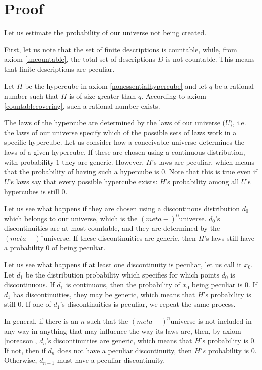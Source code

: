 \documentclass[a4paper
,draft
]{article}
\begin{document}
\section{Proof}

Let us estimate the probability of our universe not being created.

First, let us note that the set of finite descriptions is countable, while, from axiom \ref{uncountable}, the total set of descriptions $D$ is not countable. This means that finite descriptions are peculiar.

Let $H$ be the hypercube in axiom \ref{nonessentialhypercube} and let $q$ be a rational number such that $H$ is of size greater than $q$. According to axiom \ref{countablecovering}, such a rational number exists.

The laws of the hypercube are determined by the laws of our universe ($U$), i.e. the laws of our universe specify which of the possible sets of laws work in a specific hypercube. Let us consider how a conceivable universe determines the laws of a given hypercube. If these are chosen using a continuous distribution, with probability $1$ they are generic. However, $H$'s laws are peculiar, which means that the probability of having such a hypercube is $0$. Note that this is true even if $U$'s laws say that every possible hypercube exists: $H$'s probability among all $U$'s hypercubes is still $0$.

Let us see what happens if they are chosen using a discontinous distribution $d_0$ which belongs to our universe, which is the $(meta-)^0$universe. $d_0$'s discontinuities are at most countable, and they are determined by the $(meta-)^1$universe. If these discontinuities are generic, then $H$'s laws still have a probability $0$ of being peculiar.

Let us see what happens if at least one discontinuity is peculiar, let us call it $x_0$. Let $d_1$ be the distribution probability which specifies for which points $d_0$ is discontinuous. If $d_1$ is continuous, then the probability of $x_0$ being peculiar is $0$. If $d_1$ has discontinuities, they may be generic, which means that $H$'s probability is still $0$. If one of $d_1$'s discontinuities is peculiar, we repeat the same process.

In general, if there is an $n$ such that the $(meta-)^{n}$universe is not included in any way in anything that may influence the way its laws are, then, by axiom \ref{noreason}, $d_n$'s discontinuities are generic, which means that $H$'s probability is $0$. If not, then if $d_n$ does not have a peculiar discontinuity, then $H's$ probability is $0$. Otherwise, $d_{n+1}$ must have a peculiar discontinuity.
\end{document}
